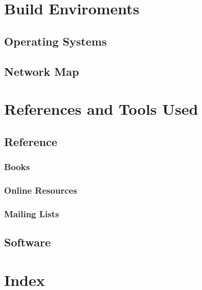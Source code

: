 \documentclass[a4paper,12pt]{report}
\begin{document}


\chapter{Build Enviroments}

\section{Operating Systems}



\section{Network Map}




\chapter{References and Tools Used}

\section{Reference}

\subsection{Books}



\subsection{Online Resources}



\subsection{Mailing Lists}



\section{Software}




\chapter{Index}

\printindex 
\end{document}
